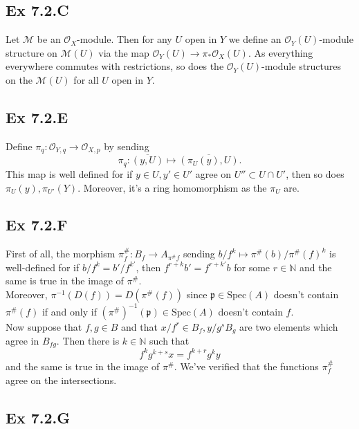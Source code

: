\documentclass{article}
\theoremstyle{definition}
\newcommand{\N}{\mathbb{N}}
\newcommand{\Spec}{\text{Spec}}
\begin{document}
\subsection*{Ex 7.2.C}

Let $\mathcal{M}$ be an $\mathcal{O}_X$-module. Then for any $U$ open in $Y$ we
define an $\mathcal{O}_Y(U)$-module structure on $\mathcal{M}(U)$ via the map
$\mathcal{O}_Y(U) \to \pi_{*}\mathcal{O}_X(U)$. As everything everywhere
commutes with restrictions, so does the $\mathcal{O}_Y(U)$-module structures on
the $\mathcal{M}(U)$ for all $U$ open in $Y$. \\

\subsection*{Ex 7.2.E}

Define $\pi_{q} : \mathcal{O}_{Y, q} \to \mathcal{O}_{X, p}$ by
sending
\[
	\pi_q
	:
	\overline{(y, U)}
	\mapsto
	\overline{(\pi_U(y), U)}.
\]
This map is well defined for if $y \in U, y' \in U'$ agree on $U'' \subset U
	\cap U'$, then so does $\pi_U(y), \pi_{U'}(Y)$. Moreover, it's a ring
homomorphism as the $\pi_U$ are.

\subsection*{Ex 7.2.F}

First of all, the morphism $\pi^{\#}_f : B_f \to A_{\pi^{\#}f}$ sending $b/f^{k}
	\mapsto \pi^{\#}(b)/\pi^{\#}(f)^{k}$ is well-defined for if $b/f^{k} =
	b'/f^{k'}$, then $f^{r + k}b' = f^{r + k'}b$ for some $r\in \N$ and the same is
true in the image of $\pi^{\#}$. \\

Moreover, $\pi^{-1}(D(f)) = D(\pi^{\#}(f))$ since $\mathfrak{p} \in \Spec(A)$
doesn't contain $\pi^{\#}(f)$ if and only if $(\pi^{\#})^{-1}(\mathfrak{p}) \in
	\Spec(A)$ doesn't contain $f$. \\

Now suppose that $f, g \in B$ and that $x/f^{r} \in B_{f}, y/g^{s} B_{g}$ are two elements
which agree in $B_{fg}$. Then there is $k \in \N$ such that
\[
	f^{k}g^{k + s}x = f^{k + r}g^{k}y
\]
and the same is true in the image of $\pi^{\#}$. We've verified that the
functions $\pi^{\#}_f$ agree on the intersections.

\subsection*{Ex 7.2.G}
\end{document}
